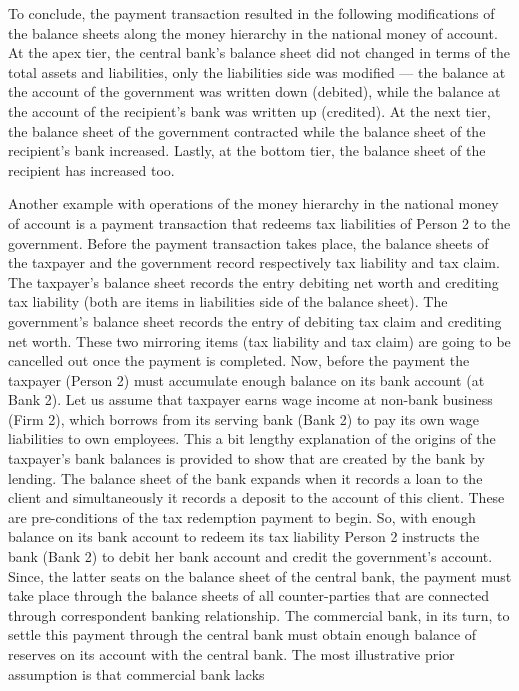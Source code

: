 To conclude, the payment transaction resulted in the following
modifications of the balance sheets along the money hierarchy in the
national money of account. At the apex tier, the central bank's
balance sheet did not changed in terms of the total assets and
liabilities, only the liabilities side was modified --- the balance at
the account of the government was written down (debited), while the
balance at the account of the recipient's bank was written up
(credited). At the next tier, the balance sheet of the government
contracted while the balance sheet of the recipient's bank increased.
Lastly, at the bottom tier, the balance sheet of the recipient has
increased too.

Another example with operations of the money hierarchy in the national
money of account is a payment transaction that redeems tax
liabilities of Person 2 to the government. Before the payment
transaction takes place, the balance sheets of the taxpayer and the
government record respectively tax liability and tax claim. The
taxpayer's balance sheet records the entry debiting net worth and
crediting tax liability (both are items in liabilities side of the
balance sheet). The government's balance sheet records the entry of
debiting tax claim and crediting net worth. These two mirroring items
(tax liability and tax claim) are going to be cancelled out once the
payment is completed. Now, before the payment the taxpayer (Person 2)
must accumulate enough balance on its bank account (at Bank 2). Let us
assume that taxpayer earns wage income at non-bank business (Firm 2),
which borrows from its serving bank (Bank 2) to pay its own wage
liabilities to own employees. This a bit lengthy explanation of the
origins of the taxpayer's bank balances is provided to show that are
created by the bank by lending. The balance sheet of the bank expands
when it records a loan to the client and simultaneously it records a
deposit to the account of this client. These are pre-conditions of the
tax redemption payment to begin. So, with enough balance on its bank
account to redeem its tax liability Person 2 instructs the bank (Bank 2)
to debit her bank account and credit the government's account. Since,
the latter seats on the balance sheet of the central bank, the payment
must take place through the balance sheets of all counter-parties that
are connected through correspondent banking relationship. The commercial
bank, in its turn, to settle this payment through the central bank must
obtain enough balance of reserves on its account with the central bank.
The most illustrative prior assumption is that commercial bank lacks
